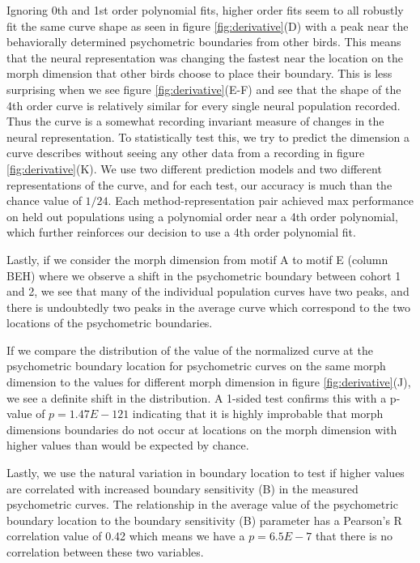 Ignoring 0th and 1st order polynomial fits, higher order fits seem to all robustly fit the same curve shape as seen in figure \ref{fig:derivative}(D) with a peak near the behaviorally determined psychometric boundaries from other birds. This means that the neural representation was changing the fastest near the location on the morph dimension that other birds choose to place their boundary. This is less surprising when we see figure \ref{fig:derivative}(E-F) and see that the shape of the 4th order \Thielk curve is relatively similar for every single neural population recorded. Thus the \Thielk curve is a somewhat recording invariant measure of changes in the neural representation. To statistically test this, we try to predict the dimension a \Thielk curve describes without seeing any other data from a recording in figure \ref{fig:derivative}(K). We use two different prediction models and two different representations of the \Thielk curve, and for each test, our accuracy is much than the chance value of $1/24$. Each method-representation pair achieved max performance on held out populations using a polynomial order near a 4th order polynomial, which further reinforces our decision to use a 4th order polynomial fit. 

Lastly, if we consider the morph dimension from motif A to motif E (column BEH) where we observe a shift in the psychometric boundary between cohort 1 and 2, we see that many of the individual population \Thielk curves have two peaks, and there is undoubtedly two peaks in the average \Thielk curve which correspond to the two locations of the psychometric boundaries.

If we compare the distribution of the value of the normalized \Thielk curve at the psychometric boundary location for psychometric curves on the same morph dimension to the values for different morph dimension in figure \ref{fig:derivative}(J), we see a definite shift in the distribution. A 1-sided \KS test confirms this with a p-value of $p=1.47E-121$ indicating that it is highly improbable that morph dimensions boundaries do not occur at locations on the morph dimension with higher \Thielk values than would be expected by chance.

Lastly, we use the natural variation in boundary location to test if higher \Thielk values are correlated with increased boundary sensitivity (B) in the measured psychometric curves. The relationship in the average \Thielk value of the psychometric boundary location to the boundary sensitivity (B) parameter has a Pearson's R correlation value of 0.42 which means we have a $p=6.5E-7$ that there is no correlation between these two variables.

